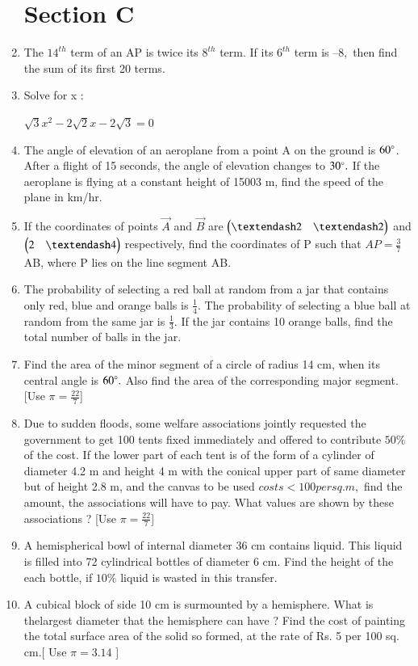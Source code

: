 \documentclass[journal,12pt,twocolumn]{IEEEtran}
\begin{document}
\begin{enumerate}
\section{Section C}
 \item The $14^{th}$ term of an AP is twice its $8^{th}$ term. If its $6^{th}$ term is $– 8,$ then find the sum of its first 20 terms.
\item Solve for x : \\
 \begin{center}
     $\sqrt{3}x^2 -2\sqrt{2}x-2\sqrt{3}= 0 $
 \end{center}
 \item The angle of elevation of an aeroplane from a point A on the ground is $60 \degree  $. After a flight of 15 seconds, the angle of elevation changes to $  30 \degree.$ If the aeroplane is flying at a constant height of 15003 m, find the speed of the plane in km/hr.
 \item If the coordinates of points $\vec{A}$ and $\vec{B}$ are $\myvec{– 2 &– 2}$ and $\myvec{2&–4}$ respectively, find the coordinates of P such that $AP =\frac{3}{7}$ AB, where P lies on the line segment AB.
 \item The probability of selecting a red ball at random from a jar that contains only red, blue and orange balls is $\frac{1}{4}.$ The probability of selecting a blue ball at random from the same jar is $\frac{1}{3}.$ If the jar contains 10 orange balls, find the total number of balls in the jar.
 \item Find the area of the minor segment of a circle of radius 14 cm, when its central angle is $60 \degree.$ Also find the area of the corresponding major segment. [Use $\pi =\frac{22}{7}$]
 \item Due to sudden floods, some welfare associations jointly requested the government to get 100 tents fixed immediately and offered to contribute $ 50\% $ of the cost. If the lower part of each tent is of the form of a cylinder of diameter 4.2 m and height 4 m with the conical upper part of same diameter but of height 2.8 m, and the canvas to be used $costs < 100 per sq. m,$ find the amount, the associations will have to pay. What values are shown by these associations ? [Use $\pi=\frac{22}{7}$]
 \item A hemispherical bowl of internal diameter 36 cm contains liquid. This liquid is filled into 72 cylindrical bottles of diameter 6 cm. Find the height of the each bottle, if $10 \% $ liquid is wasted in this transfer.
 \item A cubical block of side 10 cm is surmounted by a hemisphere. What is thelargest diameter that the hemisphere can have ? Find the cost of painting the total surface area of the solid so formed, at the rate of Rs. 5 per 100 sq. cm.[ Use $\pi= 3.14$ ]

\end{enumerate}
\end{document}

